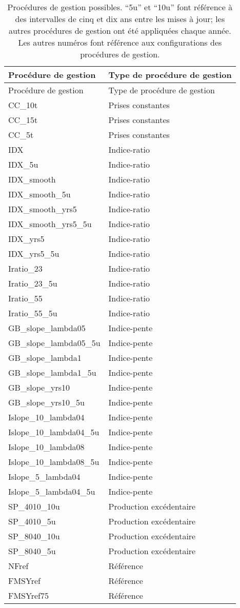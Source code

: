 \documentclass[french,11pt]{book}
\begin{document}
\clearpage
\begin{longtable}[]{@{}ll@{}}
\caption{\label{tab:mps}Procédures de gestion possibles. ``5u'' et ``10u'' font référence à des intervalles de cinq et dix ans entre les mises à jour; les autres procédures de gestion ont été appliquées chaque année. Les autres numéros font référence aux configurations des procédures de gestion.}\tabularnewline
\toprule
Procédure de gestion & Type de procédure de gestion \\
\midrule
\endfirsthead
\toprule
Procédure de gestion & Type de procédure de gestion \\
\midrule
\endhead
CC\_10t & Prises constantes \\
CC\_15t & Prises constantes \\
CC\_5t & Prises constantes \\
IDX & Indice-ratio \\
IDX\_5u & Indice-ratio \\
IDX\_smooth & Indice-ratio \\
IDX\_smooth\_5u & Indice-ratio \\
IDX\_smooth\_yrs5 & Indice-ratio \\
IDX\_smooth\_yrs5\_5u & Indice-ratio \\
IDX\_yrs5 & Indice-ratio \\
IDX\_yrs5\_5u & Indice-ratio \\
Iratio\_23 & Indice-ratio \\
Iratio\_23\_5u & Indice-ratio \\
Iratio\_55 & Indice-ratio \\
Iratio\_55\_5u & Indice-ratio \\
GB\_slope\_lambda05 & Indice-pente \\
GB\_slope\_lambda05\_5u & Indice-pente \\
GB\_slope\_lambda1 & Indice-pente \\
GB\_slope\_lambda1\_5u & Indice-pente \\
GB\_slope\_yrs10 & Indice-pente \\
GB\_slope\_yrs10\_5u & Indice-pente \\
Islope\_10\_lambda04 & Indice-pente \\
Islope\_10\_lambda04\_5u & Indice-pente \\
Islope\_10\_lambda08 & Indice-pente \\
Islope\_10\_lambda08\_5u & Indice-pente \\
Islope\_5\_lambda04 & Indice-pente \\
Islope\_5\_lambda04\_5u & Indice-pente \\
SP\_4010\_10u & Production excédentaire \\
SP\_4010\_5u & Production excédentaire \\
SP\_8040\_10u & Production excédentaire \\
SP\_8040\_5u & Production excédentaire \\
NFref & Référence \\
FMSYref & Référence \\
FMSYref75 & Référence \\
\bottomrule
\end{longtable}
\clearpage
\end{document}
